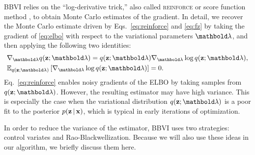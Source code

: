 \documentclass[]{article}
\begin{document}
\gls{BBVI} relies on the ``log-derivative trick,''
also called \textsc{reinforce} or score function method
\citep{Williams1992,Kleijnen1996,Glynn1990}, to obtain Monte
Carlo estimates of the gradient. In detail, we recover
the Monte Carlo estimate driven by Eqs.~\ref{eq:reinforce} and \ref{eq:fz}
by taking the gradient of \eqref{eq:elbo} with respect to the variational
parameters $\blambda$, and then applying the following two identities:
\begin{align}
  & \nabla_{\blambda} q(\bz;\blambda) =
                                      q(\bz;\blambda)\nabla_{\blambda}\log
                                      q(\bz;\blambda), \\
  & \E{q(\bz;\blambda)}{\nabla_{\blambda} \log q(\bz;\blambda)} =0 .
\end{align}
Eq.~\ref{eq:reinforce} enables noisy gradients of the \gls{ELBO} by
taking samples from $q(\bz;\blambda)$. However, the resulting
estimator may have high variance.  This is especially the case when
the variational distribution $q(\bz;\blambda)$ is a poor fit to the
posterior $p(\mathbf{z}\, | \, \mathbf{x})$, which is typical in early iterations of
optimization.





In order to reduce the variance of the estimator, \gls{BBVI} uses two
strategies: control variates and Rao-Blackwellization.  Because we
will also use these ideas in our algorithm, we briefly discuss them
here.
\end{document}

